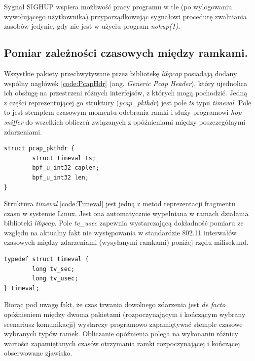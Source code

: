Sygnał SIGHUP wspiera możliwość pracy programu w tle (po wylogowaniu wywołującego użytkownika) przyporządkowując sygnałowi procedurę zwalniania zasobów jedynie, gdy nie jest w użyciu program \emph{nohup(1)}. 

\subsection{Pomiar zależności czasowych między ramkami.} 

Wszystkie pakiety przechwytywane przez bibliotekę \emph{libpcap} posiadają dodany wspólny nagłówek \ref{code:PcapHdr} (ang. \emph{Generic Pcap Header}), który ujednolica ich obsługę na przestrzeni różnych interfejsów, z których mogą pochodzić. Jedną z części reprezentującej go struktury (\emph{pcap\_pkthdr}) jest pole \emph{ts} typu \emph{timeval}. Pole to jest stemplem czasowym momentu odebrania ramki i służy programowi \emph{hop-sniffer} do wszelkich obliczeń związanych z opóźnieniami między poszczególnymi zdarzeniami.

\begin{lstlisting}[frame=tb]
struct pcap_pkthdr {
        struct timeval ts;  
        bpf_u_int32 caplen; 
        bpf_u_int32 len;
}
\end{lstlisting}

Struktura \emph{timeval} \ref{code:Timeval} jest jedną z metod reprezentacji fragmentu czasu w systemie Linux. Jest ona automatycznie wypełniana w ramach działania biblioteki \emph{libpcap}. Pole \emph{tv\_usec} zapewnia wystarczającą dokładność pomiaru ze względu na aktualny fakt nie występowania w standardzie 802.11 interwałów czasowych między zdarzeniami (wysyłanymi ramkami) poniżej rzędu milisekund. 

\begin{lstlisting}[frame=tb]
typedef struct timeval {
        long tv_sec;
        long tv_usec;
} timeval;
\end{lstlisting}

Biorąc pod uwagę fakt, że czas trwania dowolnego zdarzenia jest \emph{de facto} opóźnieniem między dwoma pakietami (rozpoczynającym i kończącym wybrany scenariusz komunikacji) wystarczy programowo zapamiętywać stemple czasowe wybranych typów ramek. Obliczanie opóźnienia polega na wykonaniu różnicy wartości zapamiętanych czasów otrzymania ramki rozpoczynającej i kończącej obserwowane zjawisko. 

